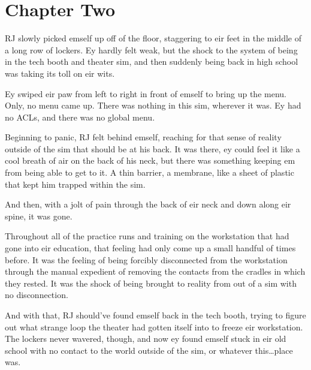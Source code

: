 \chapter*{Chapter Two}

RJ slowly picked emself up off of the floor, staggering to eir feet in the middle of a long row of lockers.  Ey hardly felt weak, but the shock to the system of being in the tech booth and theater sim, and then suddenly being back in high school was taking its toll on eir wits.

Ey swiped eir paw from left to right in front of emself to bring up the menu.  Only, no menu came up.  There was nothing in this sim, wherever it was.  Ey had no ACLs, and there was no global menu.

Beginning to panic, RJ felt behind emself, reaching for that sense of reality outside of the sim that should be at his back.  It was there, ey could feel it like a cool breath of air on the back of his neck, but there was something keeping em from being able to get to it.  A thin barrier, a membrane, like a sheet of plastic that kept him trapped within the sim.

And then, with a jolt of pain through the back of eir neck and down along eir spine, it was gone.

Throughout all of the practice runs and training on the workstation that had gone into eir education, that feeling had only come up a small handful of times before.  It was the feeling of being forcibly disconnected from the workstation through the manual expedient of removing the contacts from the cradles in which they rested.  It was the shock of being brought to reality from out of a sim with no disconnection.

And with that, RJ should've found emself back in the tech booth, trying to figure out what strange loop the theater had gotten itself into to freeze eir workstation.  The lockers never wavered, though, and now ey found emself stuck in eir old school with no contact to the world outside of the sim, or whatever this\ldots{}place was.
